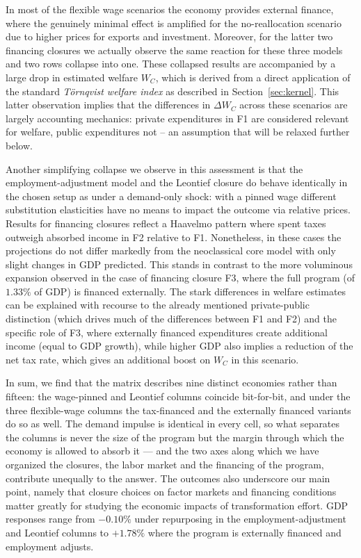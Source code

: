 In most of the flexible wage scenarios the economy provides external finance, where the genuinely minimal effect is amplified for the no-reallocation scenario due to higher prices for exports and investment. Moreover, for the latter two financing closures we actually observe the same reaction for these three models and two rows collapse into one. These collapsed results are accompanied by a large drop in estimated welfare $W_C$, which is derived from a direct application of the standard \emph{T\"ornqvist welfare index} as described in Section~\ref{sec:kernel}. This latter observation implies that the differences in $\Delta W_C$ across these scenarios are largely accounting mechanics: private expenditures in F1 are considered relevant for welfare, public expenditures not -- an assumption that will be relaxed further below.

Another simplifying collapse we observe in this assessment is that the employment-adjustment model and the Leontief closure do behave identically in the chosen setup as under a demand-only shock: with a pinned wage different substitution elasticities have no means to impact the outcome via relative prices. Results for financing closures reflect a Haavelmo pattern where spent taxes outweigh absorbed income in F2 relative to F1. Nonetheless, in these cases the projections do not differ markedly from the neoclassical core model with only slight changes in GDP predicted. This stands in contrast to the more voluminous expansion observed in the case of financing closure F3, where the full program (of $1.33\%$ of GDP) is financed externally. The stark differences in welfare estimates can be explained with recourse to the already mentioned private-public distinction (which drives much of the differences between F1 and F2) and the specific role of F3, where externally financed expenditures create additional income (equal to GDP growth), while higher GDP also implies a reduction of the net tax rate, which gives an additional boost on $W_C$ in this scenario.

In sum, we find that the matrix describes nine distinct economies rather than fifteen: the wage-pinned and Leontief columns coincide bit-for-bit, and under the three flexible-wage columns the tax-financed and the externally financed variants do so as well. The demand impulse is identical in every cell, so what separates the columns is never the size of the program but the margin through which the economy is allowed to absorb it --- and the two axes along which we have organized the closures, the labor market and the financing of the program, contribute unequally to the answer. The outcomes also underscore our main point, namely that closure choices on factor markets and financing conditions matter greatly for studying the economic impacts of transformation effort. GDP responses range from $-0.10\%$ under repurposing in the employment-adjustment and Leontief columns to $+1.78\%$ where the program is externally financed and employment adjusts.


